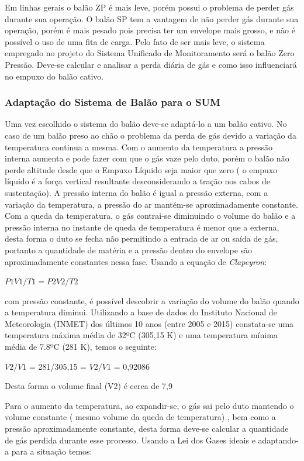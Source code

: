 	Em linhas gerais o balão ZP é mais leve, porém possui o problema de perder gás durante sua operação. O balão SP tem a vantagem de não perder gás durante sua operação, porém é mais pesado pois precisa ter um envelope mais grosso, e não é possível o uso de uma fita de carga. Pelo fato de ser mais leve, o sistema empregado no projeto do Sistema Unificado de Monitoramento será o balão Zero Pressão. Deve-se calcular e analisar a perda diária de gás e como isso influenciará no empuxo do balão cativo.

	\subsubsection{Adaptação do Sistema de Balão para o SUM}

		Uma vez escolhido o sistema do balão deve-se adaptá-lo a um balão cativo. No caso de um balão preso ao chão o problema da perda de gás devido a variação da temperatura continua a mesma. Com o aumento da temperatura a pressão interna aumenta e pode fazer com que o gás vaze pelo duto, porém o balão não perde altitude desde que o Empuxo Líquido seja maior que zero ( o empuxo líquido é a força vertical resultante desconsiderando a tração nos cabos de sustentação). A pressão interna do balão é igual a pressão externa, com a variação da temperatura, a pressão do ar mantém-se aproximadamente constante.  Com a queda da temperatura, o gás contrai-se diminuindo o volume do balão e a pressão interna no instante de queda de temperatura é menor que a externa, desta forma o duto se fecha não permitindo a entrada de ar ou saída de gás, portanto a quantidade de matéria e a pressão dentro do envelope são aproximadamente constantes nessa fase. Usando a equação de \textit{Clapeyron}:

			$P1V1/T1 = P2V2/T2$

		com pressão constante, é possível descobrir a variação do volume do balão quando a temperatura diminui. Utilizando a base de dados do Instituto Nacional de Meteorologia (INMET) dos últimos 10 anos (entre 2005 e 2015) constata-se uma temperatura máxima média de 32ºC (305,15 K) e uma temperatura mínima média de 7.8ºC (281 K), temos o seguinte:

			 $V2/V1$ = 281/305,15  = $V2/V1$ = 0,92086

		Desta forma o volume final (V2) é cerca de 7,9%

		Para o aumento da temperatura, ao expandir-se, o gás sai pelo duto mantendo o volume constante ( mesmo volume da queda de temperatura) , bem como a pressão aproximadamente constante, desta forma deve-se calcular a quantidade de gás perdida durante esse processo. Usando a Lei dos Gases ideais e adaptando-a para a situação temos:

